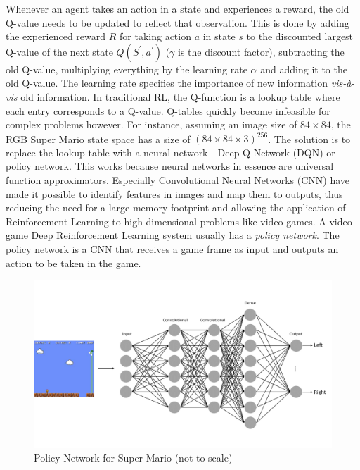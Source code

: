 \documentclass[notitlepage,a4paper,11pt]{article}
\begin{document}
Whenever an agent takes an action in a state and experiences a reward, the old Q-value needs to be updated to reflect that observation. This is done by adding the experienced reward $R$ for taking action $a$ in state $s$ to the discounted largest Q-value of the next state $Q(S^\prime, a^\prime)$ ($\gamma$ is the discount factor), subtracting the old Q-value, multiplying everything by the learning rate $\alpha$ and adding it to the old Q-value. The learning rate specifies the importance of new information \textit{vis-à-vis} old information. In traditional RL, the Q-function is a lookup table where each entry corresponds to a Q-value. Q-tables quickly become infeasible for complex problems however. For instance, assuming an image size of $84 \times 84$, the RGB Super Mario state space has a size of $(84 \times 84 \times 3)^{256}$. The solution is to replace the lookup table with a neural network - Deep Q Network (DQN) or policy network. This works because neural networks in essence are universal function approximators. Especially Convolutional Neural Networks (CNN) have made it possible to identify features in images and map them to outputs, thus reducing the need for a large memory footprint and allowing the application of Reinforcement Learning to high-dimensional problems like video games. A video game Deep Reinforcement Learning system usually has a \textit{policy network}. The policy network is a CNN that receives a game frame as input and outputs an action to be taken in the game. 

\begin{figure}[!htb]
\centering
\includegraphics[trim={0 2cm 0 2cm},clip,width=1\linewidth]{figs/deep_rl_video_game.png}
\caption{Policy Network for Super Mario (not to scale)} \label{fig:2}
\end{figure}
\end{document}
